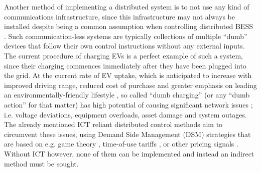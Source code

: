 Another method of implementing a distributed system is to not use any kind of communications infrastructure, since this infrastructure may not always be installed despite being a common assumption when controlling distributed BESS \cite{Hatziargyriou2015}.
Such communication-less systems are typically collections of multiple ``dumb'' devices that follow their own control instructions without any external inputs.
The current procedure of charging EVs is a perfect example of such a system, since their charging commences immediately after they have been plugged into the grid.
At the current rate of EV uptake, which is anticipated to increase with improved driving range, reduced cost of purchase and greater emphasis on leading an environmentally-friendly lifestyle \cite{Shah2015}, so called ``dumb charging'' (or any ``dumb action'' for that matter) has high potential of causing significant network issues \cite{Hota2014, Liu2015a}; i.e. voltage deviations, equipment overloads, asset damage and system outages.
The already mentioned ICT reliant distributed control methods aim to circumvent these issues, using Demand Side Management (DSM) strategies that are based on e.g. game theory \cite{Mohsenian-Rad2010}, time-of-use tariffs \cite{Deilami2011, Surles2012}, or other pricing signals \cite{Masoum2015}.
Without ICT however, none of them can be implemented and instead an indirect method must be sought.



